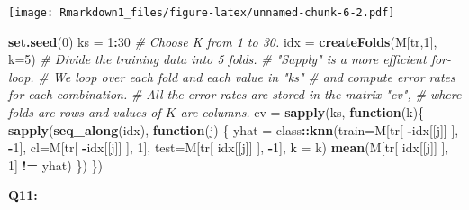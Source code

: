 \documentclass[]{article}
\newenvironment{Shaded}{\begin{snugshade}}{\end{snugshade}}
\newcommand{\KeywordTok}[1]{\textcolor[rgb]{0.13,0.29,0.53}{\textbf{#1}}}
\newcommand{\DataTypeTok}[1]{\textcolor[rgb]{0.13,0.29,0.53}{#1}}
\newcommand{\DecValTok}[1]{\textcolor[rgb]{0.00,0.00,0.81}{#1}}
\newcommand{\StringTok}[1]{\textcolor[rgb]{0.31,0.60,0.02}{#1}}
\newcommand{\CommentTok}[1]{\textcolor[rgb]{0.56,0.35,0.01}{\textit{#1}}}
\newcommand{\ControlFlowTok}[1]{\textcolor[rgb]{0.13,0.29,0.53}{\textbf{#1}}}
\newcommand{\OperatorTok}[1]{\textcolor[rgb]{0.81,0.36,0.00}{\textbf{#1}}}
\newcommand{\NormalTok}[1]{#1}
\begin{document}
\texttt{[image: Rmarkdown1\_files/figure-latex/unnamed-chunk-6-2.pdf]}

\begin{Shaded}
\begin{Highlighting}[]
\KeywordTok{set.seed}\NormalTok{(}\DecValTok{0}\NormalTok{)}
\NormalTok{ks =}\StringTok{ }\DecValTok{1}\OperatorTok{:}\DecValTok{30} \CommentTok{# Choose K from 1 to 30.}
\NormalTok{idx =}\StringTok{ }\KeywordTok{createFolds}\NormalTok{(M[tr,}\DecValTok{1}\NormalTok{], }\DataTypeTok{k=}\DecValTok{5}\NormalTok{) }\CommentTok{# Divide the training data into 5 folds.}
\CommentTok{# "Sapply" is a more efficient for-loop. }
\CommentTok{# We loop over each fold and each value in "ks"}
\CommentTok{# and compute error rates for each combination.}
\CommentTok{# All the error rates are stored in the matrix "cv", }
\CommentTok{# where folds are rows and values of $K$ are columns.}
\NormalTok{cv =}\StringTok{ }\KeywordTok{sapply}\NormalTok{(ks, }\ControlFlowTok{function}\NormalTok{(k)\{ }
  \KeywordTok{sapply}\NormalTok{(}\KeywordTok{seq_along}\NormalTok{(idx), }\ControlFlowTok{function}\NormalTok{(j) \{}
\NormalTok{    yhat =}\StringTok{ }\NormalTok{class}\OperatorTok{::}\KeywordTok{knn}\NormalTok{(}\DataTypeTok{train=}\NormalTok{M[tr[ }\OperatorTok{-}\NormalTok{idx[[j]] ], }\OperatorTok{-}\DecValTok{1}\NormalTok{],}
               \DataTypeTok{cl=}\NormalTok{M[tr[ }\OperatorTok{-}\NormalTok{idx[[j]] ], }\DecValTok{1}\NormalTok{],}
               \DataTypeTok{test=}\NormalTok{M[tr[ idx[[j]] ], }\OperatorTok{-}\DecValTok{1}\NormalTok{], }\DataTypeTok{k =}\NormalTok{ k)}
    \KeywordTok{mean}\NormalTok{(M[tr[ idx[[j]] ], }\DecValTok{1}\NormalTok{] }\OperatorTok{!=}\StringTok{ }\NormalTok{yhat)}
\NormalTok{  \})}
\NormalTok{\})}
\end{Highlighting}
\end{Shaded}

\textbf{Q11:}
\end{document}
